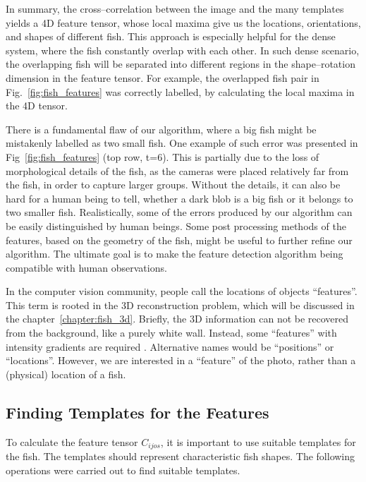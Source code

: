 \documentclass[11pt,twoside]{report}
\begin{document}
In summary, the cross--correlation between the image and the many templates yields a 4D feature tensor, whose local maxima give us the locations, orientations, and shapes of different fish. This approach is especially helpful for the dense system, where the fish constantly overlap with each other. In such dense scenario, the overlapping fish will be separated into different regions in the shape--rotation dimension in the feature tensor. For example, the overlapped fish pair in Fig.~\ref{fig:fish_features} was correctly labelled, by calculating the local maxima in the 4D tensor.


There is a fundamental flaw of our algorithm, where a big fish might be mistakenly labelled as two small fish. One example of such error was presented in Fig~\ref{fig:fish_features} (top row, t=6).
This is partially due to the loss of morphological details of the fish, as the cameras were placed relatively far from the fish, in order to capture larger groups.
Without the details, it can also be hard for a human being to tell, whether a dark blob is a big fish or it belongs to two smaller fish. Realistically, some of the errors produced by our algorithm can be easily distinguished by human beings. Some post processing methods of the features, based on the geometry of the fish, might be useful to further refine our algorithm. The ultimate goal is to make the feature detection algorithm being compatible with human observations.


\begin{tcolorbox}[
title={Why are features called features, not positions?},
enlarge bottom by=0.5em,
enlarge top by=0.5em,
]
In the computer vision community, people call the locations of objects ``features''. This term is rooted in the 3D reconstruction problem, which will be discussed in the chapter~\ref{chapter:fish_3d}. Briefly, the 3D information can not be recovered from the background, like a purely white wall. Instead, some ``features'' with intensity gradients are required \cite{ma2005}. Alternative names would be ``positions'' or ``locations''. However, we are interested in a ``feature'' of the photo, rather than a (physical) location of a fish.
\end{tcolorbox}

\subsection{Finding Templates for the Features}
\label{section:template}


To calculate the feature tensor $C_{ijos}$, it is important to use suitable templates for the fish. The templates should represent characteristic fish shapes.
The following operations were carried out to find suitable templates.
\end{document}
